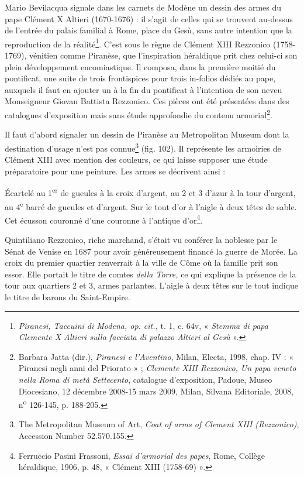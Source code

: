 \documentclass[12pt,twoside,openany]{book}
\renewenvironment{quote}
  {%
    \par\begingroup
    \fontsize{11pt}{14pt}\selectfont
    \list{}{\leftmargin=1.5em\rightmargin=1.5em}%
    \item\relax
  }
  {%
    \endlist
    \endgroup
  }
\newenvironment{PurhBlockQuote}
  {%
    \begin{quote}
  }
  {%
    \end{quote}
  }
\begin{document}
Mario Bevilacqua signale dans les carnets de Modène un dessin des armes du pape Clément X Altieri (1670-1676) : il s’agit de celles qui se trouvent au-dessus de l’entrée du palais familial à Rome, place du Gesù, sans autre intention que la reproduction de la réalité\footnote{\textit{Piranesi, Taccuini di Modena, op. cit., }t. 1, c. 64v, « \textit{Stemma di papa Clemente X Altieri sulla facciata di palazzo Altieri al Gesù} ».}. C’est sous le règne de Clément XIII Rezzonico (1758-1769), vénitien comme Piranèse, que l’inspiration héraldique prit chez celui-ci son plein développement encomiastique. Il composa, dans la première moitié du pontificat, une suite de trois frontispices pour trois in-folios dédiés au pape, auxquels il faut en ajouter un à la fin du pontificat à l’intention de son neveu Monseigneur Giovan Battista Rezzonico. Ces pièces ont été présentées dans des catalogues d’exposition mais sans étude approfondie du contenu armorial\footnote{Barbara Jatta (dir.), \textit{Piranesi e l’Aventino}, Milan, Electa, 1998, chap. IV : « Piranesi negli anni del Priorato » ; \textit{Clemente XIII Rezzonico, Un papa veneto nella Roma di metà Settecento}, catalogue d’exposition, Padoue, Museo Diocesiano, 12 décembre 2008-15 mars 2009, Milan, Silvana Editoriale, 2008, n\textsuperscript{o} 126-145, p. 188-205.}.

Il faut d’abord signaler un dessin de Piranèse au Metropolitan Museum dont la destination d’usage n’est pas connue\footnote{The Metropolitan Museum of Art, \textit{Coat of arms of Clement XIII (Rezzonico)}, Accession Number 52.570.155.} (fig. 102). Il représente les armoiries de Clément XIII avec mention des couleurs, ce qui laisse supposer une étude préparatoire pour une peinture. Les armes se décrivent ainsi :

\begin{PurhBlockQuote}
Écartelé au 1\textsuperscript{er} de gueules à la croix d’argent, au 2 et 3 d’azur à la tour d’argent, au 4\textsuperscript{e} barré de gueules et d’argent. Sur le tout d’or à l’aigle à deux têtes de sable. Cet écusson couronné d’une couronne à l’antique d’or\footnote{Ferruccio Pasini Frassoni, \textit{Essai d’armorial des papes}, Rome, Collège héraldique, 1906, p. 48, « Clément XIII (1758-69) ».}.
\end{PurhBlockQuote}

Quintiliano Rezzonico, riche marchand, s’était vu conférer la noblesse par le Sénat de Venise en 1687 pour avoir généreusement financé la guerre de Morée. La croix du premier quartier renverrait à la ville de Côme où la famille prit son essor. Elle portait le titre de comtes\textit{ della Torre,} ce qui explique la présence de la tour aux quartiers 2 et 3, armes parlantes. L’aigle à deux têtes sur le tout indique le titre de barons du Saint-Empire.
\end{document}
